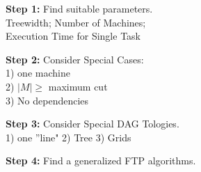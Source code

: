 \Large

\textbf{Step 1:}  Find suitable parameters. \\
Treewidth; Number of Machines; \\
Execution Time for Single Task
 
\textbf{Step 2:} Consider Special Cases:\\
1) one machine \\
2) $|M|\geq$ maximum cut \\
3) No dependencies

\textbf{Step 3:} Consider Special DAG Tologies.\\
1) one ''line" 2) Tree 3) Grids

\textbf{Step 4:} Find a generalized FTP algorithms.
